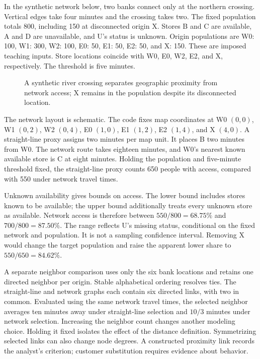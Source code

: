 In the synthetic network below, two banks connect only at the northern
crossing. Vertical edges take four minutes and the crossing takes two.
The fixed population totals 800, including 150 at disconnected origin X.
Stores B and C are available, A and D are unavailable, and U's status is
unknown. Origin populations are W0: 100, W1: 300, W2: 100, E0: 50, E1:
50, E2: 50, and X: 150. These are imposed teaching inputs. Store
locations coincide with W0, E0, W2, E2, and X, respectively. The
threshold is five minutes.

\begin{figure}[htbp]
\centering

\caption{A synthetic river crossing separates geographic proximity from network access; X remains in the population despite its disconnected location.}\label{fig:M05_access_network}
\end{figure}

The network layout is schematic. The code fixes map coordinates at W0
\((0,0)\), W1 \((0,2)\), W2 \((0,4)\), E0 \((1,0)\), E1 \((1,2)\), E2
\((1,4)\), and X \((4,0)\). A straight-line proxy assigns two minutes
per map unit. It places B two minutes from W0. The network route takes
eighteen minutes, and W0's nearest known available store is C at eight
minutes. Holding the population and five-minute threshold fixed, the
straight-line proxy counts 650 people with access, compared with 550
under network travel times.

Unknown availability gives bounds on access. The lower bound includes
stores known to be available; the upper bound additionally treats every
unknown store as available. Network access is therefore between
\(550/800=68.75\%\) and \(700/800=87.50\%\). The range reflects U's
missing status, conditional on the fixed network and population. It is
not a sampling confidence interval. Removing X would change the target
population and raise the apparent lower share to \(550/650=84.62\%\).

A separate neighbor comparison uses only the six bank locations and
retains one directed neighbor per origin. Stable alphabetical ordering
resolves ties. The straight-line and network graphs each contain six
directed links, with two in common. Evaluated using the same network
travel times, the selected neighbor averages ten minutes away under
straight-line selection and \(10/3\) minutes under network selection.
Increasing the neighbor count changes another modeling choice. Holding
it fixed isolates the effect of the distance definition. Symmetrizing
selected links can also change node degrees. A constructed proximity
link records the analyst's criterion; customer substitution requires
evidence about behavior.

